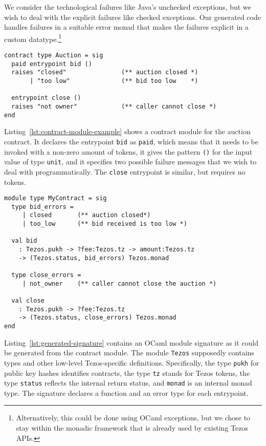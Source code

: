\documentclass[a4paper,USenglish,american,cleveref, autoref, thm-restate]{oasics-v2021}
\begin{document}
We consider the technological failures like Java's unchecked
exceptions, but we wish to deal with the explicit failures like
checked exceptions.
Our generated code handles failures in a suitable
error monad that makes the failures explicit in a custom
datatype.\footnote{Alternatively, this could be done using OCaml
  exceptions, but we chose to stay within the monadic framework that
  is already used by existing Tezos APIs.}

\begin{lstlisting}[float,captionpos=b,caption={Contract module example},label={lst:contract-module-example}]
contract type Auction = sig
  paid entrypoint bid () 
  raises "closed"               (** auction closed *)
       | "too low"              (** bid too low    *)

  entrypoint close ()
  raises "not owner"            (** caller cannot close *)
end
\end{lstlisting}
Listing~\ref{lst:contract-module-example} shows a contract module for
the auction contract.  It declares the entrypoint \lstinline/bid/ as
\lstinline/paid/, which means that it needs to be invoked with a
non-zero amount of tokens, it gives the pattern \lstinline/()/ for the
input value of type \lstinline/unit/, and it specifies two possible
failure messages that we wish to deal with programmatically.
The \lstinline/close/ entrypoint is similar, but requires no tokens.

\begin{lstlisting}[float,captionpos=b,caption={Generated signature},label={lst:generated-signature}]
module type MyContract = sig
  type bid_errors = 
     | closed       (** auction closed*)
     | too_low      (** bid received is too low *)

  val bid
    : Tezos.pukh -> ?fee:Tezos.tz -> amount:Tezos.tz
    -> (Tezos.status, bid_errors) Tezos.monad

  type close_errors = 
     | not_owner    (** caller cannot close the auction *)

  val close
    : Tezos.pukh -> ?fee:Tezos.tz
    -> (Tezos.status, close_errors) Tezos.monad
end
\end{lstlisting}
Listing~\ref{lst:generated-signature} contains an OCaml module
signature as it could be generated from the contract module. The
module \lstinline/Tezos/ supposedly contains types and other low-level
Tezos-specific definitions. Specifically, the type \lstinline/pukh/ for public
key hashes identifies contracts, the type \lstinline/tz/ stands for
Tezos tokens, the type \lstinline/status/ reflects the internal return
status, and \lstinline/monad/ is an internal monad type. The signature
declares a function and an error type for each entrypoint.
\end{document}
